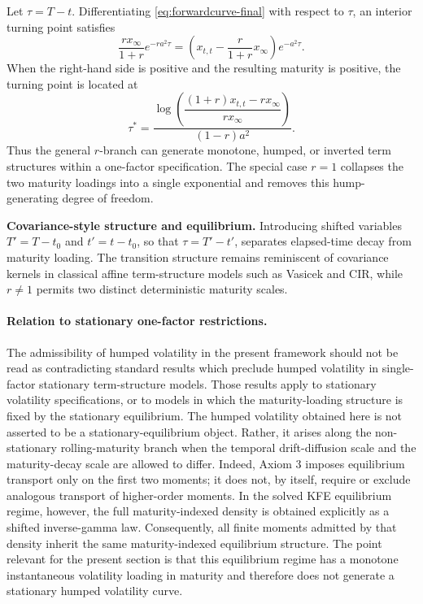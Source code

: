 \documentclass[12pt]{article}
\theoremstyle{statementstyle}
\begin{document}
Let \(\tau=T-t\). Differentiating \eqref{eq:forwardcurve-final} with
respect to \(\tau\), an interior turning point satisfies
\begin{equation}
\frac{r x_{\infty}}{1+r}e^{-ra^{2}\tau}
=
\left(
x_{t,t}-\frac{r}{1+r}x_{\infty}
\right)e^{-a^{2}\tau}.
\tag{6.3.2}\label{eq:hump-condition}
\end{equation}
When the right-hand side is positive and the resulting maturity is
positive, the turning point is located at
\begin{equation}
\tau^{\ast}
=
\frac{
\log\left(
\dfrac{(1+r)x_{t,t}-r x_{\infty}}{r x_{\infty}}
\right)
}{(1-r)a^{2}}.
\tag{6.3.3}\label{eq:hump-location}
\end{equation}
Thus the general \(r\)-branch can generate monotone, humped, or inverted
term structures within a one-factor specification. The special case
\(r=1\) collapses the two maturity loadings into a single exponential
and removes this hump-generating degree of freedom.

\medskip
\noindent\textbf{Covariance-style structure and equilibrium.}
Introducing shifted variables \(T'=T-t_{0}\) and \(t'=t-t_{0}\), so that
\(\tau=T'-t'\), separates elapsed-time decay from maturity loading. The
transition structure remains reminiscent of covariance kernels in
classical affine term-structure models such as Vasicek and CIR, while
\(r\neq 1\) permits two distinct deterministic maturity scales.

\paragraph{Relation to stationary one-factor restrictions.}
The admissibility of humped volatility in the present framework should not be read as contradicting standard results which preclude humped volatility in single-factor stationary term-structure models. Those results apply to stationary volatility specifications, or to models in which the maturity-loading structure is fixed by the stationary equilibrium. The humped volatility obtained here is not asserted to be a stationary-equilibrium object. Rather, it arises along the non-stationary rolling-maturity branch when the temporal drift-diffusion scale and the maturity-decay scale are allowed to differ.
Indeed, Axiom 3 imposes equilibrium transport only on the first two moments; it does not, by itself, require or exclude analogous transport of higher-order moments. In the solved KFE equilibrium regime, however, the full maturity-indexed density is obtained explicitly as a shifted inverse-gamma law. Consequently, all finite moments admitted by that density inherit the same maturity-indexed equilibrium structure. The point relevant for the present section is that this equilibrium regime has a monotone instantaneous volatility loading in maturity and therefore does not generate a stationary humped volatility curve.
\end{document}
